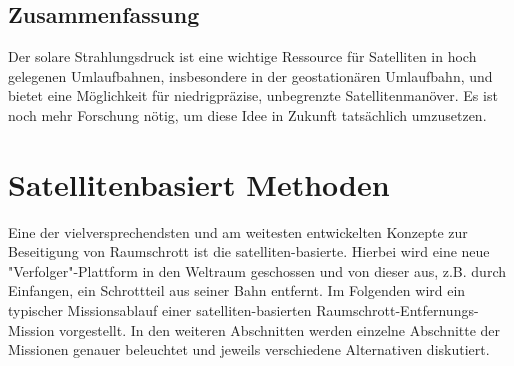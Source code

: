 \documentclass{article}
\begin{document}
\subsection{Zusammenfassung}
Der solare Strahlungsdruck ist eine wichtige Ressource für Satelliten in hoch gelegenen Umlaufbahnen, insbesondere in der geostationären Umlaufbahn, und bietet eine Möglichkeit für niedrigpräzise, unbegrenzte Satellitenmanöver. Es ist noch mehr Forschung nötig, um diese Idee in Zukunft tatsächlich umzusetzen.


\section{Satellitenbasiert Methoden}\label{sec:sate}
Eine der vielversprechendsten und am weitesten entwickelten Konzepte zur Beseitigung von Raumschrott ist die satelliten-basierte. Hierbei wird eine neue "Verfolger"-Plattform in den Weltraum geschossen und von dieser aus, z.B. durch Einfangen, ein Schrottteil aus seiner Bahn entfernt. Im Folgenden wird ein typischer Missionsablauf einer satelliten-basierten Raumschrott-Entfernungs-Mission vorgestellt. In den weiteren Abschnitten werden einzelne Abschnitte der Missionen genauer beleuchtet und jeweils verschiedene Alternativen diskutiert.
\end{document}
